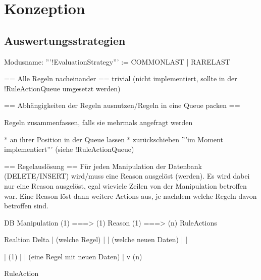 \chapter{Konzeption}







\section{Auswertungsstrategien}
Modusname: '''!EvaluationStrategy''' := COMMONLAST | RARELAST

== Alle Regeln nacheinander ==
trivial (nicht implementiert, sollte in der !RuleActionQueue umgesetzt werden)

== Abhängigkeiten der Regeln ausnutzen/Regeln in eine Queue packen ==

Regeln zusammenfassen, falls sie mehrmals angefragt werden

 * an ihrer Position in der Queue lassen
 * zurückschieben '''im Moment implementiert''' (siehe !RuleActionQueue)

== Regelauslösung ==
Für jeden Manipulation der Datenbank (DELETE/INSERT) wird/muss eine Reason ausgelöst (werden). Es wird dabei nur eine Reason ausgelöst, egal wieviele Zeilen von der Manipulation betroffen war. Eine Reason löst dann weitere Actions aus, je nachdem welche Regeln davon betroffen sind.


DB Manipulation  (1) ===> (1) Reason (1) ===> (n) RuleActions

           Realtion                     Delta
                                          |
(welche Regel) |                          | (welche neuen Daten)
               |                          |

                          | (1)
                          |
                          | (eine Regel mit neuen Daten)
                          |
                          v (n)

                      RuleAction





